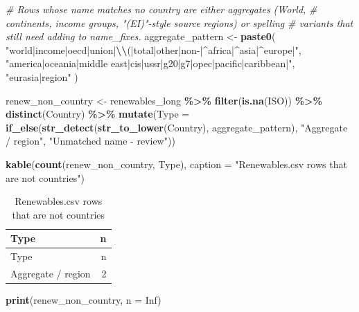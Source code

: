 \documentclass[
]{article}
\newenvironment{Shaded}{\begin{snugshade}}{\end{snugshade}}
\newcommand{\AttributeTok}[1]{\textcolor[rgb]{0.13,0.29,0.53}{#1}}
\newcommand{\CommentTok}[1]{\textcolor[rgb]{0.56,0.35,0.01}{\textit{#1}}}
\newcommand{\ConstantTok}[1]{\textcolor[rgb]{0.56,0.35,0.01}{#1}}
\newcommand{\FunctionTok}[1]{\textcolor[rgb]{0.13,0.29,0.53}{\textbf{#1}}}
\newcommand{\NormalTok}[1]{#1}
\newcommand{\OtherTok}[1]{\textcolor[rgb]{0.56,0.35,0.01}{#1}}
\newcommand{\SpecialCharTok}[1]{\textcolor[rgb]{0.81,0.36,0.00}{\textbf{#1}}}
\newcommand{\StringTok}[1]{\textcolor[rgb]{0.31,0.60,0.02}{#1}}
\begin{document}
\begin{Shaded}
\begin{Highlighting}[]
\CommentTok{\# Rows whose name matches no country are either aggregates (World,}
\CommentTok{\# continents, income groups, "(EI)"{-}style source regions) or spelling}
\CommentTok{\# variants that still need adding to name\_fixes.}
\NormalTok{aggregate\_pattern }\OtherTok{\textless{}{-}} \FunctionTok{paste0}\NormalTok{(}
  \StringTok{"world|income|oecd|union|}\SpecialCharTok{\textbackslash{}\textbackslash{}}\StringTok{(|total|other|non{-}|\^{}africa|\^{}asia|\^{}europe|"}\NormalTok{,}
  \StringTok{"america|oceania|middle east|cis|ussr|g20|g7|opec|pacific|caribbean|"}\NormalTok{,}
  \StringTok{"eurasia|region"}
\NormalTok{)}

\NormalTok{renew\_non\_country }\OtherTok{\textless{}{-}}\NormalTok{ renewables\_long }\SpecialCharTok{\%\textgreater{}\%}
  \FunctionTok{filter}\NormalTok{(}\FunctionTok{is.na}\NormalTok{(ISO)) }\SpecialCharTok{\%\textgreater{}\%}
  \FunctionTok{distinct}\NormalTok{(Country) }\SpecialCharTok{\%\textgreater{}\%}
  \FunctionTok{mutate}\NormalTok{(}\AttributeTok{Type =} \FunctionTok{if\_else}\NormalTok{(}\FunctionTok{str\_detect}\NormalTok{(}\FunctionTok{str\_to\_lower}\NormalTok{(Country), aggregate\_pattern),}
                        \StringTok{"Aggregate / region"}\NormalTok{,}
                        \StringTok{"Unmatched name {-} review"}\NormalTok{))}

\FunctionTok{kable}\NormalTok{(}\FunctionTok{count}\NormalTok{(renew\_non\_country, Type),}
      \AttributeTok{caption =} \StringTok{"Renewables.csv rows that are not countries"}\NormalTok{)}
\end{Highlighting}
\end{Shaded}

\begin{longtable}[]{@{}lr@{}}
\caption{Renewables.csv rows that are not countries}\tabularnewline
\toprule\noalign{}
Type & n \\
\midrule\noalign{}
\endfirsthead
\toprule\noalign{}
Type & n \\
\midrule\noalign{}
\endhead
\bottomrule\noalign{}
\endlastfoot
Aggregate / region & 2 \\
\end{longtable}

\begin{Shaded}
\begin{Highlighting}[]
\FunctionTok{print}\NormalTok{(renew\_non\_country, }\AttributeTok{n =} \ConstantTok{Inf}\NormalTok{)}
\end{Highlighting}
\end{Shaded}
\end{document}
